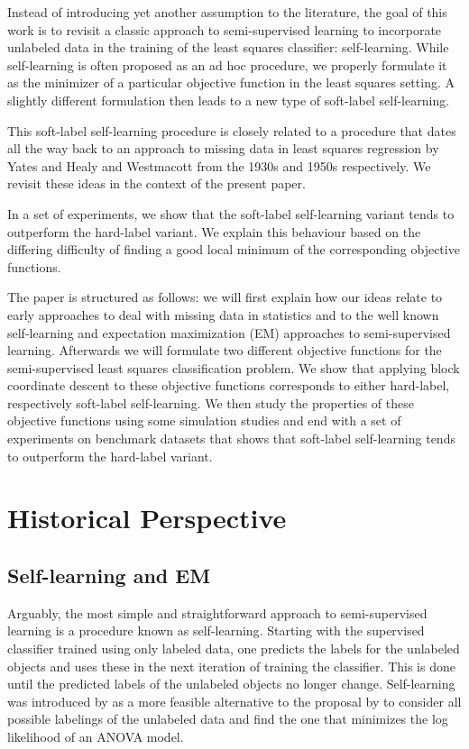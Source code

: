 \documentclass[conference,a4paper,10pt]{IEEEtran}\usepackage[]{graphicx}\usepackage[]{color}
\begin{document}
Instead of introducing yet another assumption to the literature, the goal of this work is to revisit a classic approach to semi-supervised learning to incorporate unlabeled data in the training of the least squares classifier: self-learning. While self-learning is often proposed as an ad hoc procedure, we properly formulate it as the minimizer of a particular objective function in the least squares setting. A slightly different formulation then leads to a new type of soft-label self-learning. 

This soft-label self-learning procedure is closely related to a procedure that dates all the way back to an approach to missing data in least squares regression by Yates \cite{Yates1933} and Healy and Westmacott \cite{Healy1956} from the 1930s and 1950s respectively. We revisit these ideas in the context of the present paper.

In a set of experiments, we show that the soft-label self-learning variant tends to outperform the hard-label variant. We explain this behaviour based on the differing difficulty of finding a good local minimum of the corresponding objective functions. 

The paper is structured as follows: we will first explain how our ideas relate to early approaches to deal with missing data in statistics and to the well known self-learning and expectation maximization (EM) approaches to semi-supervised learning. Afterwards we will formulate two different objective functions for the semi-supervised least squares classification problem. We show that applying block coordinate descent \cite[Ch. 2.7]{Bertsekas1999} to these objective functions corresponds to either hard-label, respectively soft-label self-learning. We then study the properties of these objective functions using some simulation studies and end with a set of experiments on benchmark datasets that shows that soft-label self-learning tends to outperform the hard-label variant.

\section{Historical Perspective}

\subsection{Self-learning and EM}
Arguably, the most simple and straightforward approach to semi-supervised learning is a procedure known as self-learning. Starting with the supervised classifier trained using only labeled data, one predicts the labels for the unlabeled objects and uses these in the next iteration of training the classifier. This is done until the predicted labels of the unlabeled objects no longer change. Self-learning was introduced by \cite{McLachlan1975,McLachlan1977} as a more feasible alternative to the proposal by \cite{Hartley1968} to consider all possible labelings of the unlabeled data and find the one that minimizes the log likelihood of an ANOVA model.
\end{document}
